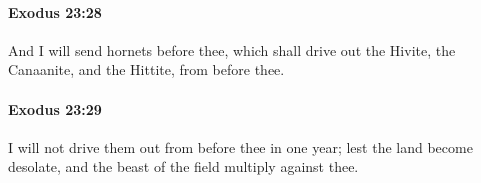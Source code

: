 		\paragraph{Exodus 23:28} %
			\label{EXODUS-23-28}

			And I will send hornets before thee, which shall drive out the Hivite, the Canaanite, and the Hittite, from before thee.


		\paragraph{Exodus 23:29} %
			\label{EXODUS-23-29}

			I will not drive them out from before thee in one year; lest the land become desolate, and the beast of the field multiply against thee.


